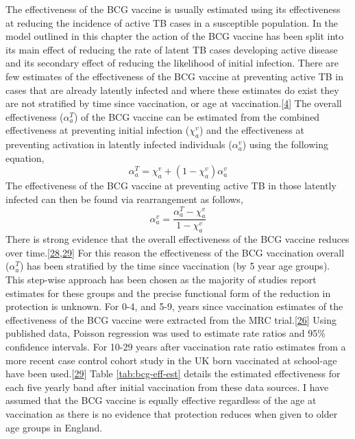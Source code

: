 \documentclass[11pt,twoside]{bristolthesis}
\begin{document}
  The effectiveness of the BCG vaccine is usually estimated using its effectiveness at reducing the incidence of active TB cases in a susceptible population. In the model outlined in this chapter the action of the BCG vaccine has been split into its main effect of reducing the rate of latent TB cases developing active disease and its secondary effect of reducing the likelihood of initial infection. There are few estimates of the effectiveness of the BCG vaccine at preventing active TB in cases that are already latently infected and where these estimates do exist they are not stratified by time since vaccination, or age at vaccination.{[}\protect\hyperlink{ref-Roy2014}{4}{]} The overall effectiveness (\(\alpha^T_a\)) of the BCG vaccine can be estimated from the combined effectiveness at preventing initial infection (\(\chi^v_a\)) and the effectiveness at preventing activation in latently infected individuals (\(\alpha^v_a\)) using the following equation,
  \begin{equation}
    \alpha^T_a = \chi^v_a + (1 - \chi^v_a) \alpha^v_a
    \label{eq:full-bcg-effectiveness}
  \end{equation}
  The effectiveness of the BCG vaccine at preventing active TB in those latently infected can then be found via rearrangement as follows,
  \begin{equation}
    \alpha^v_a = \frac{\alpha^T_a - \chi^v_a}{1 - \chi^v_a}
    \label{eq:latent-active-bcg-effectiveness}
  \end{equation}
  There is strong evidence that the overall effectiveness of the BCG vaccine reduces over time.{[}\protect\hyperlink{ref-Abubakar2013}{28},\protect\hyperlink{ref-Mangtani2017}{29}{]} For this reason the effectiveness of the BCG vaccination overall (\(\alpha^T_a\)) has been stratified by the time since vaccination (by 5 year age groups). This step-wise approach has been chosen as the majority of studies report estimates for these groups and the precise functional form of the reduction in protection is unknown. For 0-4, and 5-9, years since vaccination estimates of the effectiveness of the BCG vaccine were extracted from the MRC trial.{[}\protect\hyperlink{ref-Hart1972}{26}{]} Using published data, Poisson regression was used to estimate rate ratios and 95\% confidence intervals. For 10-29 years after vaccination rate ratio estimates from a more recent case control cohort study in the UK born vaccinated at school-age have been used.{[}\protect\hyperlink{ref-Mangtani2017}{29}{]} Table \ref{tab:bcg-eff-est} details the estimated effectiveness for each five yearly band after initial vaccination from these data sources. I have assumed that the BCG vaccine is equally effective regardless of the age at vaccination as there is no evidence that protection reduces when given to older age groups in England.
\end{document}
